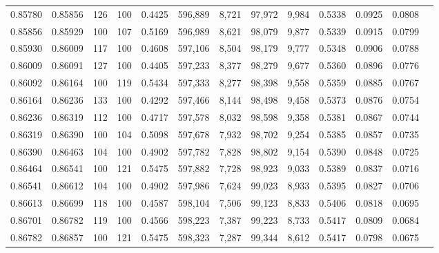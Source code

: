 \begin{tabular}{rrrrrrrrrrrrr}
0.85780 & 0.85856 &   126 & 100 &                                     0.4425 & 596,889 &   8,721 &  97,972 &   9,984 & 0.5338 & 0.0925 & 0.0808 \\
0.85856 & 0.85929 &   100 & 107 &                                     0.5169 & 596,989 &   8,621 &  98,079 &   9,877 & 0.5339 & 0.0915 & 0.0799 \\
0.85930 & 0.86009 &   117 & 100 &                                     0.4608 & 597,106 &   8,504 &  98,179 &   9,777 & 0.5348 & 0.0906 & 0.0788 \\
0.86009 & 0.86091 &   127 & 100 &                                     0.4405 & 597,233 &   8,377 &  98,279 &   9,677 & 0.5360 & 0.0896 & 0.0776 \\
0.86092 & 0.86164 &   100 & 119 &                                     0.5434 & 597,333 &   8,277 &  98,398 &   9,558 & 0.5359 & 0.0885 & 0.0767 \\
0.86164 & 0.86236 &   133 & 100 &                                     0.4292 & 597,466 &   8,144 &  98,498 &   9,458 & 0.5373 & 0.0876 & 0.0754 \\
0.86236 & 0.86319 &   112 & 100 &                                     0.4717 & 597,578 &   8,032 &  98,598 &   9,358 & 0.5381 & 0.0867 & 0.0744 \\
0.86319 & 0.86390 &   100 & 104 &                                     0.5098 & 597,678 &   7,932 &  98,702 &   9,254 & 0.5385 & 0.0857 & 0.0735 \\
0.86390 & 0.86463 &   104 & 100 &                                     0.4902 & 597,782 &   7,828 &  98,802 &   9,154 & 0.5390 & 0.0848 & 0.0725 \\
0.86464 & 0.86541 &   100 & 121 &                                     0.5475 & 597,882 &   7,728 &  98,923 &   9,033 & 0.5389 & 0.0837 & 0.0716 \\
0.86541 & 0.86612 &   104 & 100 &                                     0.4902 & 597,986 &   7,624 &  99,023 &   8,933 & 0.5395 & 0.0827 & 0.0706 \\
0.86613 & 0.86699 &   118 & 100 &                                     0.4587 & 598,104 &   7,506 &  99,123 &   8,833 & 0.5406 & 0.0818 & 0.0695 \\
0.86701 & 0.86782 &   119 & 100 &                                     0.4566 & 598,223 &   7,387 &  99,223 &   8,733 & 0.5417 & 0.0809 & 0.0684 \\
0.86782 & 0.86857 &   100 & 121 &                                     0.5475 & 598,323 &   7,287 &  99,344 &   8,612 & 0.5417 & 0.0798 & 0.0675 \\

\end{tabular}
